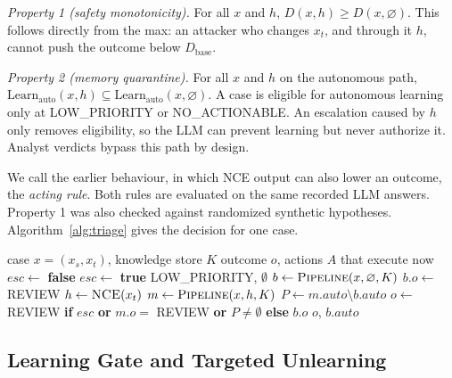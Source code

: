 \documentclass[conference]{IEEEtran}
\begin{document}
\emph{Property 1 (safety monotonicity).} For all $x$ and $h$, $D(x,h) \ge D(x,\varnothing)$. This follows directly
from the max: an attacker who changes $x_t$, and through it $h$, cannot push the outcome below $D_{\mathrm{base}}$.

\emph{Property 2 (memory quarantine).} For all $x$ and $h$ on the autonomous path,
$\mathrm{Learn}_{\mathrm{auto}}(x,h) \subseteq \mathrm{Learn}_{\mathrm{auto}}(x,\varnothing)$. A case is eligible for
autonomous learning only at LOW\_PRIORITY or NO\_ACTIONABLE. An escalation caused by $h$ only removes
eligibility, so the LLM can prevent learning but never authorize it. Analyst verdicts bypass this path by design.

We call the earlier behaviour, in which NCE output can also lower an outcome, the \emph{acting rule}. Both rules are
evaluated on the same recorded LLM answers. Property 1 was also checked against randomized synthetic hypotheses.
Algorithm~\ref{alg:triage} gives the decision for one case.

\begin{algorithm}[t]
\caption{Triage decision under asymmetric trust}
\label{alg:triage}
\footnotesize
\begin{algorithmic}[1]
\Require case $x = (x_s, x_t)$, knowledge store $K$
\Ensure outcome $o$, actions $A$ that execute now
\State $\mathit{esc} \gets$ \textbf{false}
  \State $\mathit{esc} \gets$ \textbf{true} 
  \State \Return LOW\_PRIORITY, $\emptyset$ 
\EndIf
\State $b \gets \textsc{Pipeline}(x, \varnothing, K)$ 
  \State $b.o \gets$ REVIEW 
\EndIf
\State $h \gets \textsc{NCE}(x_t)$ 
\State $m \gets \textsc{Pipeline}(x, h, K)$ 
\State $P \gets m.\mathit{auto} \setminus b.\mathit{auto}$ 
\State $o \gets$ REVIEW \textbf{if} $\mathit{esc}$ \textbf{or} $m.o =$ REVIEW \textbf{or} $P \ne \emptyset$
\textbf{else} $b.o$
\State \Return $o$, $b.\mathit{auto}$ 
\end{algorithmic}
\end{algorithm}

\subsection{Learning Gate and Targeted Unlearning}
\end{document}
